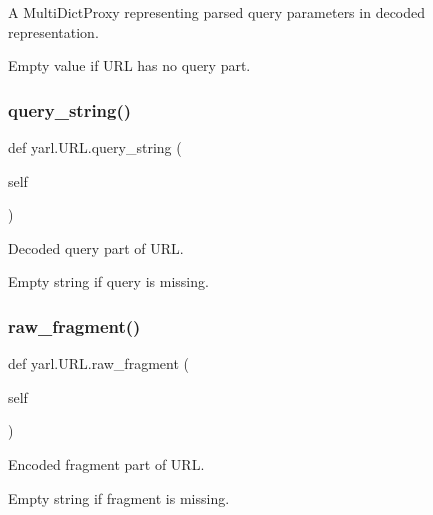 \begin{DoxyVerb}A MultiDictProxy representing parsed query parameters in decoded
representation.

Empty value if URL has no query part.\end{DoxyVerb}
 \mbox{\label{classyarl_1_1_u_r_l_ae0c2703179536721d215c1fb7f46b82e}} 
\subsubsection{\texorpdfstring{query\+\_\+string()}{query\_string()}}
{\footnotesize\ttfamily def yarl.\+U\+R\+L.\+query\+\_\+string (\begin{DoxyParamCaption}\item[{}]{self }\end{DoxyParamCaption})}

\begin{DoxyVerb}Decoded query part of URL.

Empty string if query is missing.\end{DoxyVerb}
 \mbox{\label{classyarl_1_1_u_r_l_a5f0396ee0d1c7b899d8fbc110d34b73e}} 
\subsubsection{\texorpdfstring{raw\+\_\+fragment()}{raw\_fragment()}}
{\footnotesize\ttfamily def yarl.\+U\+R\+L.\+raw\+\_\+fragment (\begin{DoxyParamCaption}\item[{}]{self }\end{DoxyParamCaption})}

\begin{DoxyVerb}Encoded fragment part of URL.

Empty string if fragment is missing.\end{DoxyVerb}
 \mbox{\label{classyarl_1_1_u_r_l_a4a92cf50fec13ea6bca92e97c604bdc2}} 
